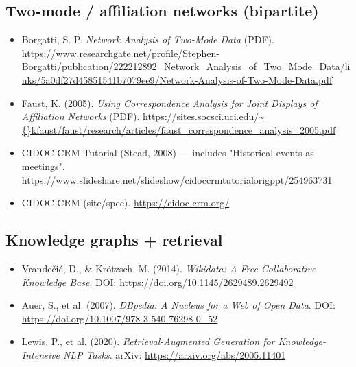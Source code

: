 \subsection*{Two-mode / affiliation networks (bipartite)}

\begin{itemize}[leftmargin=*]

\item Borgatti, S. P. \emph{Network Analysis of Two-Mode Data} (PDF). \url{https://www.researchgate.net/profile/Stephen-Borgatti/publication/222212892\_Network\_Analysis\_of\_Two\_Mode\_Data/links/5a0df27d45851541b7079ee9/Network-Analysis-of-Two-Mode-Data.pdf}

\item Faust, K. (2005). \emph{Using Correspondence Analysis for Joint Displays of Affiliation Networks} (PDF). \url{https://sites.socsci.uci.edu/\~{}kfaust/faust/research/articles/faust\_correspondence\_analysis\_2005.pdf}

\item CIDOC CRM Tutorial (Stead, 2008) --- includes "Historical events as meetings". \url{https://www.slideshare.net/slideshow/cidoccrmtutorialorigppt/254963731}

\item CIDOC CRM (site/spec). \url{https://cidoc-crm.org/}

\end{itemize}

\subsection*{Knowledge graphs + retrieval}

\begin{itemize}[leftmargin=*]

\item Vrandečić, D., \& Krötzsch, M. (2014). \emph{Wikidata: A Free Collaborative Knowledge Base}. DOI: \url{https://doi.org/10.1145/2629489.2629492}

\item Auer, S., et al. (2007). \emph{DBpedia: A Nucleus for a Web of Open Data}. DOI: \url{https://doi.org/10.1007/978-3-540-76298-0\_52}

\item Lewis, P., et al. (2020). \emph{Retrieval-Augmented Generation for Knowledge-Intensive NLP Tasks}. arXiv: \url{https://arxiv.org/abs/2005.11401}

\end{itemize}

